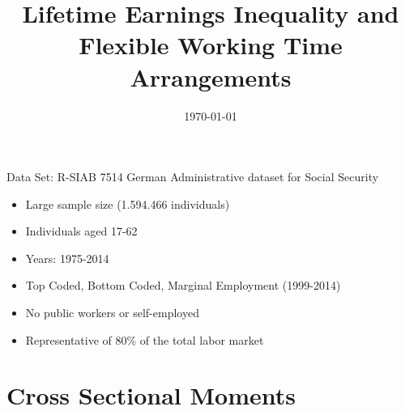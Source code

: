\documentclass[handout]{beamer}
\title{Lifetime Earnings Inequality and Flexible Working Time Arrangements}
\author[Short Name (U ABC)]{%
  \texorpdfstring{%
    \begin{columns}
      \column{.5\linewidth}
      \centering
Manuel Sanchez
    \end{columns}
 }
{Author 1}
}
\institute{University of Bristol}
\date{\today}
\begin{document}
\begin{frame}
  \titlepage
\end{frame}


\begin{frame}{Data Set: R-SIAB 7514}
German Administrative dataset for Social Security\\

\vfill
\begin{itemize}
\vfill
\item Large sample size (1.594.466 individuals)
\vfill
\item Individuals aged 17-62
\vfill
\item Years: 1975-2014
\vfill
\item Top Coded, Bottom Coded, Marginal Employment (1999-2014)
\vfill
\item No public workers or self-employed
\vfill
\item Representative of 80\% of the total labor market
\end{itemize}
\end{frame}


\section{Cross Sectional Moments}
\subsection{}

\begin{frame}
\end{frame}
\end{document}
